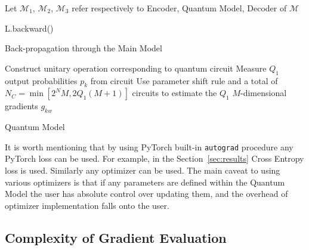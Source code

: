 \begin{footnotesize}
\begin{algorithm}[h]
	\SetAlgoLined

	Let $\mathcal{M}_1$, $\mathcal{M}_2$, $\mathcal{M}_3$ refer respectively to Encoder, Quantum Model, Decoder of $\mathcal{M}$\;

	L.backward()\;

	\caption{Back-propagation through the Main Model}
	\label{alg:main-backprop}
\end{algorithm}
\end{footnotesize}

\begin{footnotesize}
\begin{algorithm}[h]
	\SetAlgoLined
	Construct unitary operation corresponding to quantum circuit\;
	Measure $Q_1$ output probabilities $p_k$ from circuit\;
	Use parameter shift rule and a total of $N_C=\min\left[2^{N}M,2Q_1(M+1)\right]$ circuits to estimate the $Q_1$ $M$-dimensional gradients $g_{kw}$\;
	\caption{Quantum Model}
	\label{alg:quantum-backprop}
\end{algorithm}
\end{footnotesize}

It is worth mentioning that by using PyTorch built-in \texttt{autograd} procedure any PyTorch loss can be used.
For example, in the Section~\ref{sec:results} Cross Entropy loss is used.
Similarly any optimizer can be used.
The main caveat to using various optimizers is that if any parameters are defined within the Quantum Model the user has absolute control over updating them,
and the overhead of optimizer implementation falls onto the user.

\subsection{Complexity of Gradient Evaluation}
\label{sec:complexity}

